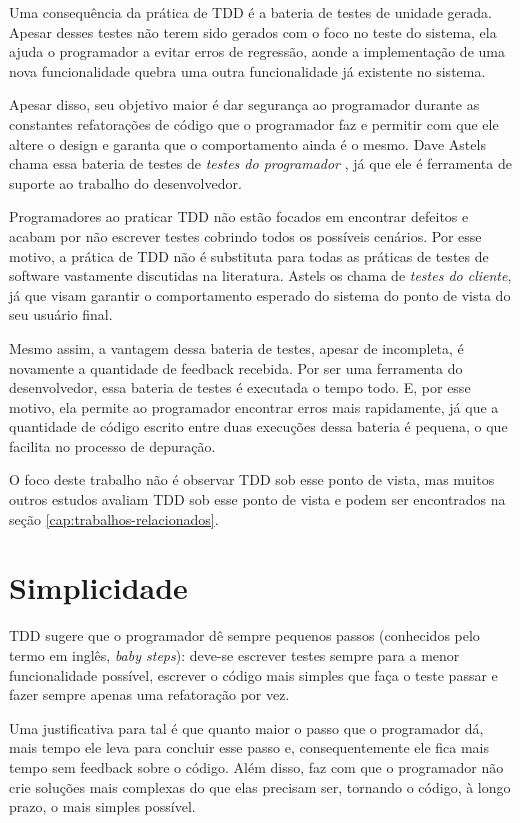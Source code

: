Uma consequência da prática de TDD é a bateria de testes de unidade gerada.
Apesar desses testes não terem sido gerados com o foco no teste do sistema, 
ela ajuda o programador a evitar erros de regressão, aonde a implementação de
uma nova funcionalidade quebra uma outra funcionalidade já existente no sistema.

Apesar disso, seu objetivo maior é dar segurança ao programador durante as
constantes refatorações de código que o programador faz e permitir com que ele
altere o design e garanta que o comportamento ainda é o mesmo. Dave Astels chama
essa bateria de testes de \textit{testes do programador} \cite{astels-tdd}, já
que ele é ferramenta de suporte ao trabalho do desenvolvedor.

Programadores ao praticar TDD não estão focados em encontrar defeitos e
acabam por não escrever testes cobrindo todos os possíveis cenários. Por esse
motivo, a prática de TDD não é substituta para todas as práticas de testes de
software vastamente discutidas na literatura. Astels os chama de \textit{testes do
cliente}, já que visam garantir o comportamento esperado do sistema do ponto de
vista do seu usuário final.

Mesmo assim, a vantagem dessa bateria de testes, apesar de incompleta, é
novamente a quantidade de feedback recebida. Por ser uma ferramenta do
desenvolvedor, essa bateria de testes é executada o tempo todo. E, por esse
motivo, ela permite ao programador encontrar erros mais rapidamente, já que a
quantidade de código escrito entre duas execuções dessa bateria é pequena, o que
facilita no processo de depuração.

O foco deste trabalho não é observar TDD sob esse ponto de vista, mas muitos
outros estudos avaliam TDD sob esse ponto de vista e podem ser encontrados na
seção \ref{cap:trabalhos-relacionados}.

\section{Simplicidade}

TDD sugere que o programador dê sempre pequenos passos (conhecidos pelo termo em
inglês, \textit{baby steps}): deve-se escrever testes sempre para a menor
funcionalidade possível, escrever o código mais simples que faça o teste passar
e fazer sempre apenas uma refatoração por vez.

Uma justificativa para tal é que quanto maior o passo que o programador dá, mais
tempo ele leva para concluir esse passo e, consequentemente ele fica mais tempo
sem feedback sobre o código. Além disso, faz com que o programador não crie
soluções mais complexas do que elas precisam ser, tornando o código, à longo
prazo, o mais simples possível.


